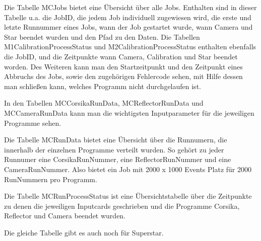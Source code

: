 
Die Tabelle MCJobs bietet eine Übersicht über alle Jobs. 
Enthalten sind in dieser Tabelle u.a. die JobID, die jedem Job individuell zugewiesen wird, die erste und letzte Runnummer eines Jobs, wann der Job gestartet wurde, wann Camera und Star beendet wurden und den Pfad zu den Daten.\newline
Die Tabellen M1CalibrationProcessStatus und M2CalibrationProcessStatus enthalten ebenfalls die JobID, und die Zeitpunkte wann Camera, Calibration und Star beendet worden. 
Des Weiteren kann man den Startzeitpunkt und den Zeitpunkt eines Abbruchs des Jobs, sowie den zugehörigen Fehlercode sehen, mit Hilfe dessen man schließen kann, welches Programm nicht durchgelaufen ist.

In den Tabellen MCCorsikaRunData, MCReflectorRunData und MCCameraRunData kann man die wichtigsten Inputparameter für die jeweiligen Programme sehen.

Die Tabelle MCRunData bietet eine Übersicht über die Runnumern, die innerhalb der einzelnen Programme verteilt wurden. 
So gehört zu jeder Runnumer eine CorsikaRunNummer, eine ReflectorRunNummer und eine CameraRunNummer.
Also bietet ein Job mit 2000 x 1000 Events Platz für 2000 RunNummern pro Programm.

Die Tabelle MCRunProcessStatus ist eine Übersichtstabelle über die Zeitpunkte zu denen die jeweiligen Inputcards geschrieben und die Programme Corsika, Reflector und Camera beendet wurden.

Die gleiche Tabelle gibt es auch noch für Superstar. 


